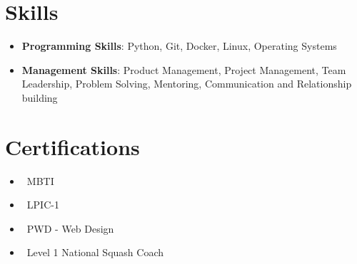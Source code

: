 \documentclass[letterpaper,10pt]{article}
\newcommand{\resumeItem}[1]{\item\small{#1}}
\newcommand{\resumeSubHeadingList}{\begin{itemize}[leftmargin=0.15in, label={}]}
\newcommand{\resumeSubHeadingListEnd}{\end{itemize}}
\begin{document}
\section{Skills}
\resumeSubHeadingList
  \resumeItem{\textbf{Programming Skills}: Python, Git, Docker, Linux, Operating Systems}
  \resumeItem{\textbf{Management Skills}: Product Management, Project Management, Team Leadership,       Problem Solving, Mentoring, Communication and Relationship building}
\resumeSubHeadingListEnd

\section{Certifications}
\resumeSubHeadingList
  \resumeItem{\textbullet\ MBTI}
  \resumeItem{\textbullet\ LPIC-1}
  \resumeItem{\textbullet\ PWD - Web Design}
  \resumeItem{\textbullet\ Level 1 National Squash Coach}
\resumeSubHeadingListEnd
\end{document}
